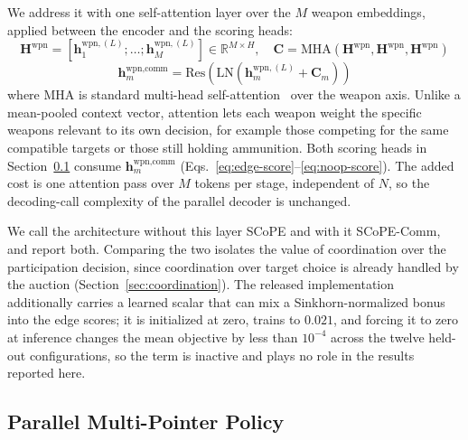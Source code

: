 We address it with one self-attention layer over the $M$ weapon embeddings, applied between the encoder and the scoring heads:
\begin{equation}
\label{eq:comm-attn}
\bm{H}^{\text{wpn}} = \left[\bm{h}_1^{\text{wpn},(L)}; \ldots; \bm{h}_M^{\text{wpn},(L)}\right] \in \mathbb{R}^{M\times H}, \quad
\bm{C} = \text{MHA}\!\left(\bm{H}^{\text{wpn}}, \bm{H}^{\text{wpn}}, \bm{H}^{\text{wpn}}\right)
\end{equation}
\begin{equation}
\label{eq:comm-out}
\bm{h}_m^{\text{wpn,comm}} = \text{Res}\!\left(\text{LN}\!\left(\bm{h}_m^{\text{wpn},(L)} + \bm{C}_m\right)\right)
\end{equation}
where $\text{MHA}$ is standard multi-head self-attention~\cite{vaswani2017attention} over the weapon axis. Unlike a mean-pooled context vector, attention lets each weapon weight the specific weapons relevant to its own decision, for example those competing for the same compatible targets or those still holding ammunition. Both scoring heads in Section~\ref{sec:parallel-decoder} consume $\bm{h}_m^{\text{wpn,comm}}$ (Eqs.~\eqref{eq:edge-score}--\eqref{eq:noop-score}). The added cost is one attention pass over $M$ tokens per stage, independent of $N$, so the decoding-call complexity of the parallel decoder is unchanged.

We call the architecture without this layer SCoPE and with it SCoPE-Comm, and report both. Comparing the two isolates the value of coordination over the participation decision, since coordination over target choice is already handled by the auction (Section~\ref{sec:coordination}). The released implementation additionally carries a learned scalar that can mix a Sinkhorn-normalized bonus into the edge scores; it is initialized at zero, trains to $0.021$, and forcing it to zero at inference changes the mean objective by less than $10^{-4}$ across the twelve held-out configurations, so the term is inactive and plays no role in the results reported here.

\subsection{Parallel Multi-Pointer Policy}
\label{sec:parallel-decoder}

